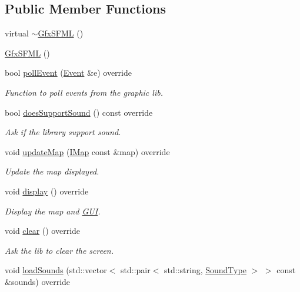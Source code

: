 \subsection*{Public Member Functions}
\begin{DoxyCompactItemize}
\item 
virtual \hyperlink{classarcade_1_1_gfx_s_f_m_l_a66702cb942c775a31364c12fe5d6e06a}{$\sim$\+Gfx\+S\+F\+ML} ()
\item 
\hyperlink{classarcade_1_1_gfx_s_f_m_l_ad7ba5ca3fb9816b283a8603d6d28686f}{Gfx\+S\+F\+ML} ()
\item 
bool \hyperlink{classarcade_1_1_gfx_s_f_m_l_a7c2d800770d4218eb38c8b01f5890aa3}{poll\+Event} (\hyperlink{structarcade_1_1_event}{Event} \&e) override
\begin{DoxyCompactList}\small\item\em Function to poll events from the graphic lib. \end{DoxyCompactList}\item 
bool \hyperlink{classarcade_1_1_gfx_s_f_m_l_aa8d0f997c7ddcb68526e0f19f5bad77d}{does\+Support\+Sound} () const override
\begin{DoxyCompactList}\small\item\em Ask if the library support sound. \end{DoxyCompactList}\item 
void \hyperlink{classarcade_1_1_gfx_s_f_m_l_ad21d26a1e549e2da25da1c9f4155151c}{update\+Map} (\hyperlink{classarcade_1_1_i_map}{I\+Map} const \&map) override
\begin{DoxyCompactList}\small\item\em Update the map displayed. \end{DoxyCompactList}\item 
void \hyperlink{classarcade_1_1_gfx_s_f_m_l_a590d6b932d5200a1367d8a2ff76def61}{display} () override
\begin{DoxyCompactList}\small\item\em Display the map and \hyperlink{classarcade_1_1_g_u_i}{G\+UI}. \end{DoxyCompactList}\item 
void \hyperlink{classarcade_1_1_gfx_s_f_m_l_a12711203981dc2b9ce60df96d0aa6f55}{clear} () override
\begin{DoxyCompactList}\small\item\em Ask the lib to clear the screen. \end{DoxyCompactList}\item 
void \hyperlink{classarcade_1_1_gfx_s_f_m_l_aaec16dc42e480cdb6b6cbc3f75e4951c}{load\+Sounds} (std\+::vector$<$ std\+::pair$<$ std\+::string, \hyperlink{namespacearcade_a3bb4743a2eea59f3927e404e6549cae5}{Sound\+Type} $>$ $>$ const \&sounds) override

\end{DoxyCompactItemize}
